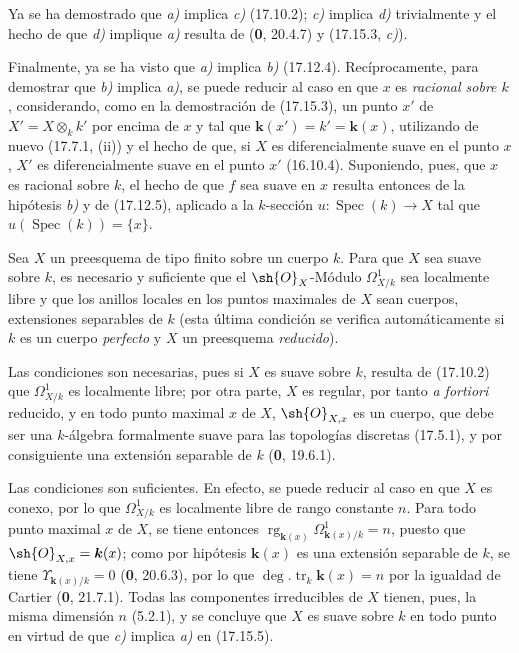 Ya se ha demostrado que \emph{a)} implica \emph{c)} (17.10.2); \emph{c)} implica \emph{d)} trivialmente y el hecho de que \emph{d)} implique \emph{a)} resulta de (\textbf 0, 20.4.7) y (17.15.3, \emph{c)}).

Finalmente, ya se ha visto que \emph{a)} implica \emph{b)} (17.12.4). Recíprocamente, para demostrar que \emph{b)} implica \emph{a)}, se puede reducir al caso en que $x$ es \emph{racional sobre $k$}, considerando, como en la demostración de (17.15.3), un punto $x'$ de $X'=X\otimes_k k'$ por encima de $x$ y tal que $\boldsymbol{k}(x')=k'=\boldsymbol{k}(x)$, utilizando de nuevo (17.7.1, (ii)) y el hecho de que, si $X$ es diferencialmente suave en el punto $x$, $X'$ es diferencialmente suave en el punto $x'$ (16.10.4). Suponiendo, pues, que $x$ es racional sobre $k$, el hecho de que $f$ sea suave en $x$ resulta entonces de la hipótesis \emph{b)} y de (17.12.5), aplicado a la $k$-sección $u:\operatorname{Spec}(k)\to X$ tal que $u(\operatorname{Spec}(k))=\{x\}$.

\begin{corollary}[17.15.6]
\label{IV.17.15.6}
Sea $X$ un preesquema de tipo finito sobre un cuerpo $k$. Para que $X$ sea suave sobre $k$, es necesario y suficiente que el $\sh{O}_X$-Módulo $\varOmega^1_{X/k}$ sea localmente libre y que los anillos locales en los puntos maximales de $X$ sean cuerpos, extensiones separables de $k$ \textup{(esta última condición se verifica automáticamente si $k$ es un cuerpo \emph{perfecto} y $X$ un preesquema \emph{reducido})}.
\end{corollary}

Las condiciones son necesarias, pues si $X$ es suave sobre $k$, resulta de (17.10.2) que $\varOmega^1_{X/k}$ es localmente libre; por otra parte, $X$ es regular, por tanto \emph{a fortiori} reducido, y en todo punto maximal $x$ de $X$, $\sh{O}_{X,x}$ es un cuerpo, que debe ser una $k$-álgebra formalmente suave para las topologías discretas (17.5.1), y por consiguiente una extensión separable de $k$ (\textbf 0, 19.6.1).

Las condiciones son suficientes. En efecto, se puede reducir al caso en que $X$ es conexo, por lo que $\varOmega^1_{X/k}$ es localmente libre de rango constante $n$. Para todo punto maximal $x$ de $X$, se tiene entonces $\operatorname{rg}_{\mathbf{k}(x)}\Omega^1_{\mathbf{k}(x)/k}=n$, puesto que $\sh{O}_{X,x}=\boldsymbol{k}(x)$; como por hipótesis $\boldsymbol{k}(x)$ es una extensión separable de $k$, se tiene $\Upsilon_{\mathbf{k}(x)/k}=0$ (\textbf 0, 20.6.3), por lo que $\deg.\operatorname{tr}_k \boldsymbol{k}(x)=n$ por la igualdad de Cartier (\textbf 0, 21.7.1). Todas las componentes irreducibles de $X$ tienen, pues, la misma dimensión $n$ (5.2.1), y se concluye que $X$ es suave sobre $k$ en todo punto en virtud de que \emph{c)} implica \emph{a)} en (17.15.5).

